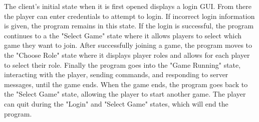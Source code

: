 
The client's initial state when it is first opened displays a login GUI. From there the player can enter credentials to attempt to login. If incorrect login information is given, the program remains in this state. If the login is successful, the program continues to a the "Select Game" state where it allows players to select which game they want to join. After successfully joining a game, the program moves to the "Choose Role" state where it displays player roles and allows for each player to select their role. Finally the program goes into the "Game Running" state, interacting with the player, sending commands, and responding to server messages, until the game ends. When the game ends, the program goes back to the "Select Game" state, allowing the player to start another game. The player can quit during the "Login" and "Select Game" states, which will end the program.